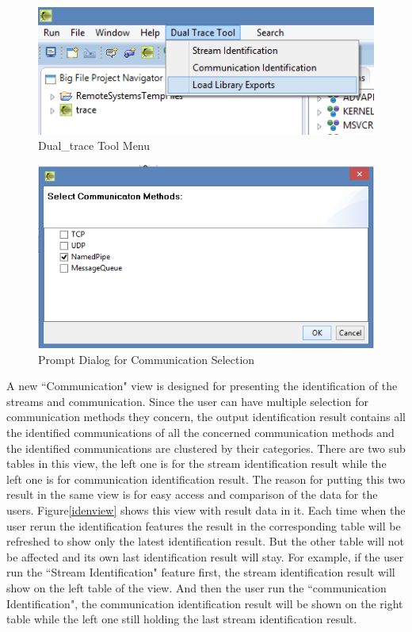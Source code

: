 \begin{figure}[H]
\centerline{\includegraphics{Figures/dualtracetoolmenu}}
 \caption{Dual\_trace Tool Menu}
\label{dualtracetoolmenu}
\end{figure}

\begin{figure}[H]
\centerline{\includegraphics[scale=0.8]{Figures/methods}}
 \caption{Prompt Dialog for Communication Selection}
\label{methods}
\end{figure}

A new ``Communication" view is designed for presenting the identification of the streams and communication. Since the user can have multiple selection for communication methods they concern, the output identification result contains all the identified communications of all the concerned communication methods and the identified communications are clustered by their categories. There are two sub tables in this view, the left one is for the stream identification result while the left one is for communication identification result. The reason for putting this two result in the same view is for easy access and comparison of the data for the users. Figure\ref{idenview} shows this view with result data in it. Each time when the user rerun the identification features the result in the corresponding table will be refreshed to show only the latest identification result. But the other table will not be affected and its own last identification result will stay. For example, if the user run the ``Stream Identification" feature first, the stream identification result will show on the left table of the view. And then the user run the ``communication Identification", the communication identification result will be shown on the right table while the left one still holding the last stream identification result.

